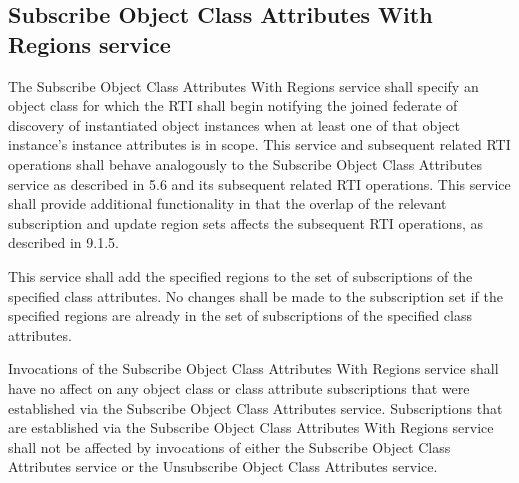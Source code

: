 \begin{compactstdpage}
    \subsection{Subscribe Object Class Attributes With Regions service}

    The Subscribe Object Class Attributes With Regions service shall specify an object class for which the RTI shall begin notifying the joined federate of discovery of instantiated object instances when at least one of that object instance's instance attributes is in scope. This service and subsequent related RTI operations shall behave analogously to the Subscribe Object Class Attributes service as described in 5.6 and its subsequent related RTI operations. This service shall provide additional functionality in that the overlap of the relevant subscription and update region sets affects the subsequent RTI operations, as described in 9.1.5.

    This service shall add the specified regions to the set of subscriptions of the specified class attributes. No changes shall be made to the subscription set if the specified regions are already in the set of subscriptions of the specified class attributes.

    Invocations of the Subscribe Object Class Attributes With Regions service shall have no affect on any object class or class attribute subscriptions that were established via the Subscribe Object Class Attributes service. Subscriptions that are established via the Subscribe Object Class Attributes With Regions service shall not be affected by invocations of either the Subscribe Object Class Attributes service or the Unsubscribe Object Class Attributes service.


\end{compactstdpage}

\clearpage


